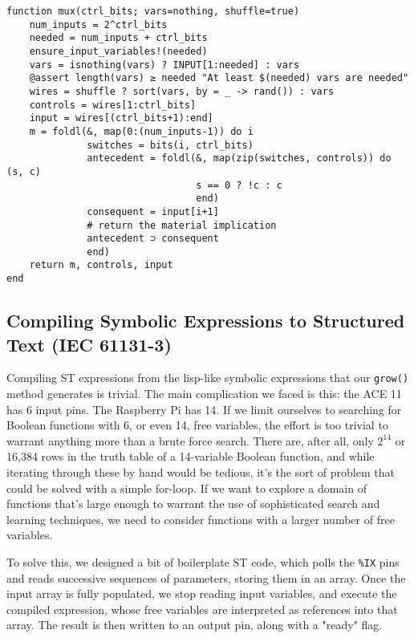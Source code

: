 \documentclass[11pt]{article}
\begin{document}
\begin{verbatim}
function mux(ctrl_bits; vars=nothing, shuffle=true)
    num_inputs = 2^ctrl_bits
    needed = num_inputs + ctrl_bits
    ensure_input_variables!(needed)
    vars = isnothing(vars) ? INPUT[1:needed] : vars
    @assert length(vars) ≥ needed "At least $(needed) vars are needed"
    wires = shuffle ? sort(vars, by = _ -> rand()) : vars
    controls = wires[1:ctrl_bits]
    input = wires[(ctrl_bits+1):end]
    m = foldl(&, map(0:(num_inputs-1)) do i
              switches = bits(i, ctrl_bits)
              antecedent = foldl(&, map(zip(switches, controls)) do (s, c)
                                 s == 0 ? !c : c
                                 end)
              consequent = input[i+1]
              # return the material implication
              antecedent ⊃ consequent 
              end)
    return m, controls, input
end
\end{verbatim}

\subsection{Compiling Symbolic Expressions to Structured Text (IEC 61131-3)}
\label{sec:org6c96dd5}



Compiling ST expressions from the lisp-like symbolic expressions that our \texttt{grow()} method generates is trivial. The main complication we faced is this: the ACE 11 has 6 input pins. The Raspberry Pi has 14. If we limit ourselves to searching for Boolean functions with 6, or even 14, free variables, the effort is too trivial to warrant anything more than a brute force search. There are, after all, only \(2^14\) or 16,384 rows in the truth table of a 14-variable Boolean function, and while iterating through these by hand would be tedious, it's the sort of problem that could be solved with a simple for-loop. If we want to explore a domain of functions that's large enough to warrant the use of sophisticated search and learning techniques, we need to consider functions with a larger number of free variables.

To solve this, we designed a bit of boilerplate ST code, which polls the \texttt{\%IX} pins and reads successive sequences of parameters, storing them in an array. Once the input array is fully populated, we stop reading input variables, and execute the compiled expression, whose free variables are interpreted as references into that array. The result is then written to an output pin, along with a "ready" flag.
\end{document}
